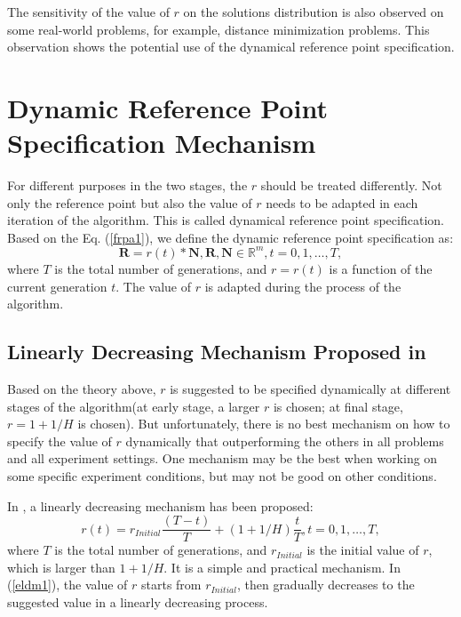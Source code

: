 \documentclass[conference]{IEEEtran}
\begin{document}
The sensitivity of the value of $r$ on the solutions distribution is also observed on some real-world problems,
for example, distance minimization problems. 
This observation shows the potential use of the dynamical reference point specification\cite{hisao:dynamic}.

\section{Dynamic Reference Point Specification Mechanism}
For different purposes in the two stages, the $r$ should be treated differently\cite{hisao:dynamic}. 
Not only the reference point but also the value of $r$ 
needs to be adapted in each iteration of the algorithm. 
This is called dynamical reference point specification. 
Based on the Eq. (\ref{frpa1}), 
we define the dynamic reference point specification as:
\begin{equation}\label{f2}
  \boldsymbol R = r(t) * \boldsymbol N, 
  \boldsymbol R, \boldsymbol N \in \mathbb{R}^m, t=0,1,\dots,T,
\end{equation}
where $T$ is the total number of generations, and $r=r(t)$ is a function of the current generation $t$.
The value of $r$ is adapted during the process of the algorithm. 

% 
\subsection{Linearly Decreasing Mechanism Proposed in \cite{hisao:dynamic}} 
Based on the theory above, $r$ is suggested to be specified dynamically at different stages of
the algorithm(at early stage, a larger $r$ is chosen; at final stage, $r=1+1/H$ is chosen).
But unfortunately, there is no best mechanism on how to specify the value of $r$ dynamically
that outperforming the others in all problems and all experiment settings. One mechanism may be the best
when working on some specific experiment conditions, but may not be good on other conditions. 

In \cite{hisao:dynamic}, a linearly decreasing mechanism has been proposed:
\begin{equation}\label{eldm1}
  r(t)=r_{Initial}\frac{(T-t)}{T}+(1+1/H)\frac{t}{T}, t=0,1,\dots,T,
\end{equation}
where $T$ is the total number of generations, and $r_{Initial}$ is the initial value of $r$,
which is larger than $1+1/H$. 
It is a simple and practical mechanism. In (\ref{eldm1}), the value of $r$ starts from $r_{Initial}$,
then gradually decreases to the suggested value in a linearly decreasing process. 
\end{document}
